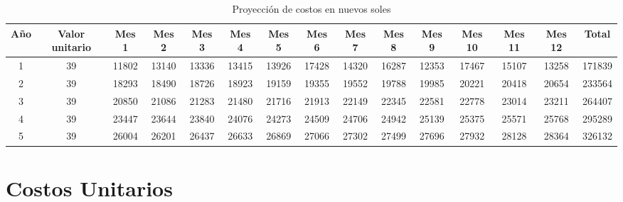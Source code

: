 \documentclass[a4paper,openright,12pt]{book}
\begin{document}
\begin{table}[H]
\centering
\resizebox{18cm}{!} {
\begin{tabular}{ccccccccccccccc}
\hline
\textbf{Año} & \textbf{Valor unitario} & \textbf{Mes 1} & \textbf{Mes 2} & \textbf{Mes 3} & \textbf{Mes 4} & \textbf{Mes 5} & \textbf{Mes 6} & \textbf{Mes 7} & \textbf{Mes 8} & \textbf{Mes 9} & \textbf{Mes 10} & \textbf{Mes 11} & \textbf{Mes 12} & \textbf{Total} \\ \hline
1            & 39                      & 11802          & 13140          & 13336          & 13415          & 13926          & 17428          & 14320          & 16287          & 12353          & 17467           & 15107           & 13258           & 171839         \\
2            & 39                      & 18293          & 18490          & 18726          & 18923          & 19159          & 19355          & 19552          & 19788          & 19985          & 20221           & 20418           & 20654           & 233564         \\
3            & 39                      & 20850          & 21086          & 21283          & 21480          & 21716          & 21913          & 22149          & 22345          & 22581          & 22778           & 23014           & 23211           & 264407         \\
4            & 39                      & 23447          & 23644          & 23840          & 24076          & 24273          & 24509          & 24706          & 24942          & 25139          & 25375           & 25571           & 25768           & 295289         \\
5            & 39                      & 26004          & 26201          & 26437          & 26633          & 26869          & 27066          & 27302          & 27499          & 27696          & 27932           & 28128           & 28364           & 326132         \\ \hline
\end{tabular}
}
\caption{Proyección de costos en nuevos soles}
\label{Tabla8}
\end{table}

\section{Costos Unitarios}
\end{document}
